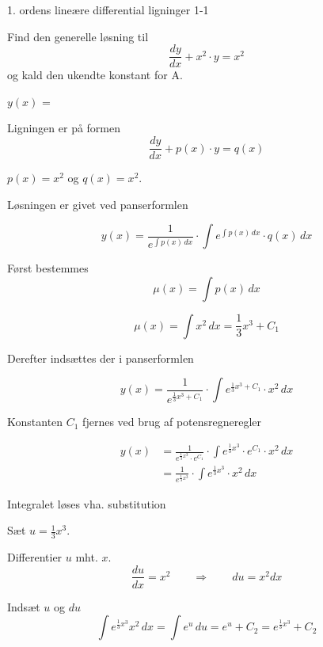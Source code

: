 \documentclass{article}
\begin{document}
\tableofcontents
\newpage

\begin{exercise}{1. ordens lineære differential ligninger 1-1}


Find den generelle løsning til
\[
\frac{dy}{dx} + x^2 \cdot y = x^2
\]
og kald den ukendte konstant for A.

$y(x)$ =  \\



\hint

Ligningen er på formen
\[
\frac{dy}{dx} + p(x) \cdot y = q(x)
\]

\hint

$p(x)=x^2$ og $q(x)=x^2$.

\hint

Løsningen er givet ved panserformlen


\hint

\[
y(x) = \frac{1}{e^{\int p(x) \, dx}} \cdot \int e^{\int p(x) \, dx}  \cdot q(x) \, dx
\]

\hint

Først bestemmes 
\[
\mu(x) = \int p(x) \, dx
\]

\hint
\[
\mu(x) = \int x^2 \, dx = \frac{1}{3} x^3 + C_1
\]

\hint
Derefter indsættes der i  panserformlen

\hint

\[
y(x) = \frac{1}{e^{\frac{1}{3}x^3 + C_1}} \cdot \int e^{\frac{1}{3}x^3 + C_1}  \cdot x^2 \, dx
\]


\hint

Konstanten $C_1$ fjernes ved brug af potensregneregler

\hint
\begin{align*}
y(x) &= \frac{1}{e^{\frac{1}{3}x^3} \cdot e^{C_1}} \cdot \int e^{\frac{1}{3}x^3} \cdot e^{C_1}  \cdot x^2 \, dx  \\
	   &= \frac{1}{e^{\frac{1}{3}x^3}} \cdot \int e^{\frac{1}{3}x^3}  \cdot x^2 \, dx
\end{align*}

\hint

Integralet løses vha. substitution


\hint
Sæt $u = \frac{1}{3}x^3$.

\hint

Differentier $u$ mht. $x$.
\[
\frac{du}{dx} = x^2 \qquad	\Rightarrow \qquad du = x^2 dx
\]

\hint 
Indsæt $u$ og $du$
\[
\int e^{\frac{1}{3}x^3}x^2 \, dx = \int e^{u} \, du = e^{u} + C_2 = e^{\frac{1}{3}x^3} + C_2
\]


\end{exercise}
\end{document}
